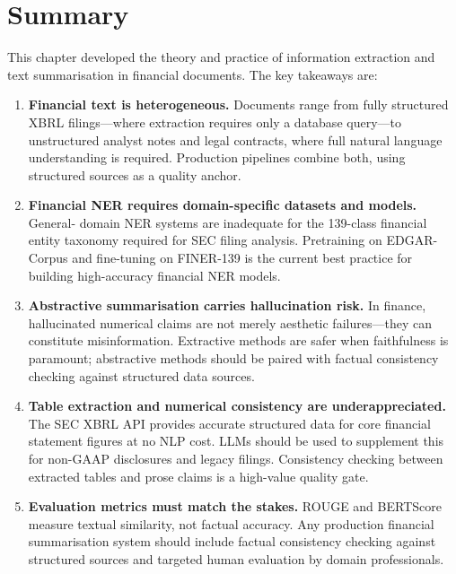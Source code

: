 \section{Summary}
\label{sec:ch14-summary}

This chapter developed the theory and practice of information extraction and text
summarisation in financial documents. The key takeaways are:

\begin{enumerate}
  \item \textbf{Financial text is heterogeneous.} Documents range from fully structured
        XBRL filings---where extraction requires only a database query---to unstructured
        analyst notes and legal contracts, where full natural language understanding is
        required. Production pipelines combine both, using structured sources as a
        quality anchor.

  \item \textbf{Financial NER requires domain-specific datasets and models.} General-
        domain NER systems are inadequate for the 139-class financial entity taxonomy
        required for SEC filing analysis. Pretraining on EDGAR-Corpus and fine-tuning
        on FINER-139 is the current best practice for building high-accuracy financial
        NER models.

  \item \textbf{Abstractive summarisation carries hallucination risk.} In finance,
        hallucinated numerical claims are not merely aesthetic failures---they can
        constitute misinformation. Extractive methods are safer when faithfulness is
        paramount; abstractive methods should be paired with factual consistency checking
        against structured data sources.

  \item \textbf{Table extraction and numerical consistency are underappreciated.}
        The SEC XBRL API provides accurate structured data for core financial statement
        figures at no NLP cost. LLMs should be used to supplement this for non-GAAP
        disclosures and legacy filings. Consistency checking between extracted tables
        and prose claims is a high-value quality gate.

  \item \textbf{Evaluation metrics must match the stakes.} ROUGE and BERTScore
        measure textual similarity, not factual accuracy. Any production financial
        summarisation system should include factual consistency checking against
        structured sources and targeted human evaluation by domain professionals.
\end{enumerate}


